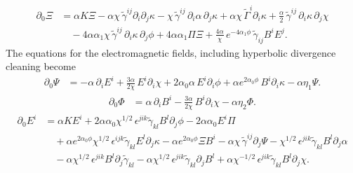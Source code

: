 \begin{equation}
\begin{aligned}
\partial_0 \Xi
&= \alpha K \Xi
- \alpha \chi\, \tilde{\gamma}^{ij} \partial_i \partial_j \kappa
- \chi\, \tilde{\gamma}^{ij}\, \partial_i \alpha\, \partial_j \kappa
+ \alpha \chi\, \tilde{\Gamma}^i \partial_i \kappa
+ \frac{\alpha}{2}\, \tilde{\gamma}^{ij}\, \partial_i \kappa\, \partial_j \chi
\\[6pt]
&\quad
- 4 \alpha \alpha_1 \chi\, \tilde{\gamma}^{ij}\,
  \partial_i \kappa\, \partial_j \phi
+ 4 \alpha \alpha_1 \Pi \Xi
+ \frac{4\alpha}{\chi}\,
  e^{-4\alpha_1 \phi}\,
  \tilde{\gamma}_{ij} B^i E^j .
\end{aligned}
\end{equation}
The equations for the electromagnetic fields, including hyperbolic divergence cleaning become
\begin{equation}
\begin{aligned}
\partial_0 \Psi
&= - \alpha\, \partial_i E^i
+ \frac{3\alpha}{2\chi}\, E^i \partial_i \chi
+ 2 \alpha_0 \alpha\, E^i \partial_i \phi
+ \alpha e^{2\alpha_0 \phi}\, B^i \partial_i \kappa
- \alpha \eta_1 \Psi .
\end{aligned}
\end{equation}
\begin{equation}
\begin{aligned}
\partial_0 \Phi
&= \alpha\, \partial_i B^i
- \frac{3\alpha}{2\chi}\, B^i \partial_i \chi
- \alpha \eta_2 \Phi .
\end{aligned}
\end{equation}
\begin{equation}
\begin{aligned}
\partial_0 E^i
&= \alpha K E^i
+ 2 \alpha \alpha_0 \chi^{1/2}\,
  \epsilon^{jik}\tilde{\gamma}_{kl} B^l \partial_j \phi
- 2 \alpha \alpha_0 E^i \Pi
\\[6pt]
&\quad
+ \alpha e^{2\alpha_0 \phi} \chi^{1/2}\,
  \epsilon^{ijk}\tilde{\gamma}_{kl} E^l \partial_j \kappa
- \alpha e^{2\alpha_0 \phi} \Xi B^i
- \alpha \chi\, \tilde{\gamma}^{ij} \partial_j \Psi
- \chi^{1/2}\, \epsilon^{jik}\tilde{\gamma}_{kl} B^l \partial_j \alpha
\\[4pt]
&\quad
- \alpha \chi^{1/2}\, \epsilon^{jik} B^l \partial_j \tilde{\gamma}_{kl}
- \alpha \chi^{1/2}\, \epsilon^{jik}\tilde{\gamma}_{kl} \partial_j B^l
+ \alpha \chi^{-1/2}\, \epsilon^{jik}\tilde{\gamma}_{kl} B^l \partial_j \chi .
\end{aligned}
\end{equation}

